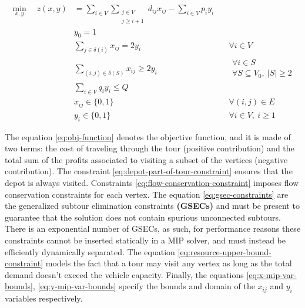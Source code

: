 \begin{align}
	\min_{x,y} \quad z(x, y) & =  \sum_{i \in V} \sum_{\substack{j \in V                                                                                 \\ j \ge i + 1}} d_{ij} x_{ij} - \sum_{i \in V} p_i y_i \label{eq:obj-function}\\
	                         & y_0 = 1                                           & \label{eq:depot-part-of-tour-constraint}                              \\
	                         & \sum_{j \in \delta(i)}       x_{ij}  = 2 y_i      & \quad \forall i \in V         \label{eq:flow-conservation-constraint} \\
	                         & \sum_{(i, j) \in \delta(S)} x_{ij} \ge 2 y_{i}    & \quad \substack{\forall i \in S                                       \\ \forall S \subseteq V_0,\ |S| \ge 2} \label{eq:gsec-constraints} \\
	                         & \sum_{i \in V} q_i y_i   \le Q                    & \label{eq:resource-upper-bound-constraint}                            \\
	                         & x_{ij}                   \in \lbrace 0, 1 \rbrace & \quad \forall (i, j) \in E               \label{eq:x-mip-var-bounds}  \\
	                         & y_{i}                    \in \lbrace 0, 1 \rbrace & \quad \forall i \in V,\ i \ge 1          \label{eq:y-mip-var-bounds}
\end{align}

The equation \eqref{eq:obj-function} denotes the objective function, and it is made of two terms: the cost of traveling through the tour (positive contribution) and the total sum of the profits associated to visiting a subset of the vertices (negative contribution).
The constraint \eqref{eq:depot-part-of-tour-constraint} ensures that the depot is always visited.
Constraints \eqref{eq:flow-conservation-constraint} imposes flow conservation constraints for each vertex.
The equation \eqref{eq:gsec-constraints} are the generalized subtour elimination constraints \textbf{(GSECs)} and must be present to guarantee that the solution does not contain spurious unconnected subtours.
There is an exponential number of GSECs, as such, for performance reasons these constraints cannot be inserted statically in a MIP solver, and must instead be efficiently dynamically separated.
The equation \eqref{eq:resource-upper-bound-constraint} models the fact that a tour may visit any vertex as long as the total demand doesn't exceed the vehicle capacity.
Finally, the equations \eqref{eq:x-mip-var-bounds}, \eqref{eq:y-mip-var-bounds} specify the bounds and domain of the $x_{ij}$ and $y_{i}$ variables respectively.

